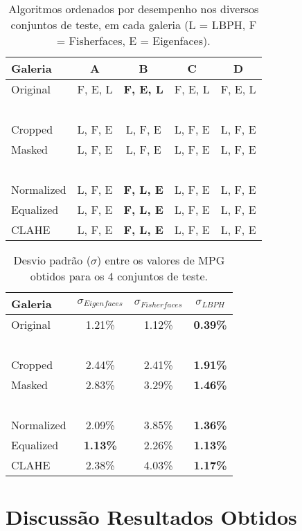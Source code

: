 \begin{center}
\begin{table}
    \begin{center}
    \caption{Algoritmos ordenados por desempenho nos diversos conjuntos de teste, em cada galeria (L = LBPH, F = Fisherfaces, E = Eigenfaces).}
    \begin{tabular}{l|cccc}
    Galeria    & A & B & C & D \\ 
    \hline\hline
    Original   & F, E, L          &\textbf{ F, E, L }         & F, E, L           & F, E, L    \\
    ~ \\
    Cropped    & L, F, E          & L, F, E          & L, F, E           & L, F, E    \\
    Masked     & L, F, E          & L, F, E          & L, F, E           & L, F, E    \\
    ~ \\
    Normalized & L, F, E          &\textbf{ F, L, E}          & L, F, E           & L, F, E    \\
    Equalized  & L, F, E          &\textbf{ F, L, E}          & L, F, E           & L, F, E    \\
    CLAHE      & L, F, E          &\textbf{ F, L, E}          & L, F, E           & L, F, E    \\
    \hline\hline
    \end{tabular}
    \label{tab:ordem_algoritmos}
    \end{center}
\end{table}
\end{center}

\begin{center}
\begin{table}
    \begin{center}
    \caption{Desvio padrão ($\sigma$) entre os valores de MPG obtidos para os 4 conjuntos de teste.}
    \begin{tabular}{l|ccc}
    Galeria    & $\sigma_{Eigenfaces}$ & $\sigma_{Fisherfaces}$ & $\sigma_{LBPH}$ \\ 
    \hline\hline
    Original   & 1.21\%          & 1.12\%           & \textbf{0.39\%}    \\
    ~ \\
    Cropped    & 2.44\%          & 2.41\%           & \textbf{1.91\%}    \\
    Masked     & 2.83\%          & 3.29\%           & \textbf{1.46\%}    \\
    ~ \\
    Normalized & 2.09\%          & 3.85\%           & \textbf{1.36\%}    \\
    Equalized  &\textbf{ 1.13\%} & 2.26\%           & \textbf{1.13\%}    \\
    CLAHE      & 2.38\%          & 4.03\%           & \textbf{1.17\%}    \\
    \hline\hline
    \end{tabular}
    \label{tab:desviopadrao}
    \end{center}
\end{table}
\end{center}

\section{Discussão Resultados Obtidos} \label{sec:discussao}
